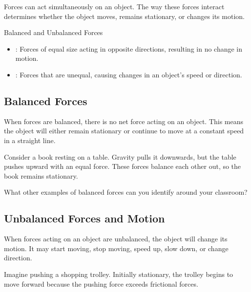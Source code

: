 Forces can act simultaneously on an object. The way these forces interact determines whether the object moves, remains stationary, or changes its motion.

\begin{keyconcept}{Balanced and Unbalanced Forces}
\begin{itemize}
    \item {}: Forces of equal size acting in opposite directions, resulting in no change in motion.
    \item {}: Forces that are unequal, causing changes in an object's speed or direction.
\end{itemize}
\end{keyconcept}

\subsection{Balanced Forces}

When forces are balanced, there is no net force acting on an object. This means the object will either remain stationary or continue to move at a constant speed in a straight line.

\begin{example}
Consider a book resting on a table. Gravity pulls it downwards, but the table pushes upward with an equal force. These forces balance each other out, so the book remains stationary.
\end{example}

\begin{stopandthink}
What other examples of balanced forces can you identify around your classroom?
\end{stopandthink}

\subsection{Unbalanced Forces and Motion}

When forces acting on an object are unbalanced, the object will change its motion. It may start moving, stop moving, speed up, slow down, or change direction.

\begin{example}
Imagine pushing a shopping trolley. Initially stationary, the trolley begins to move forward because the pushing force exceeds frictional forces.
\end{example}

